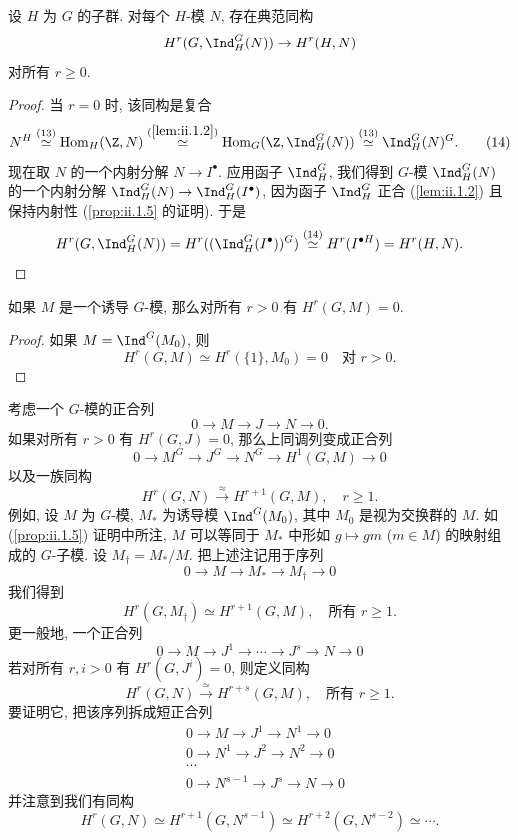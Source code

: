 \begin{proposition}[Shapiro 引理]\label{prop:ii.1.11}
设 $H$ 为 $G$ 的子群. 对每个 $H$-模 $N$, 存在典范同构
\[
 H^r(G,\Ind_H^G(N))\to H^r(H,N)
\]
对所有 $r\ge 0$.
\end{proposition}

\begin{proof}
当 $r=0$ 时, 该同构是复合
\begin{equation*}
 N^H\overset{(13)}{\simeq}\operatorname{Hom}_H(\Z,N)\overset{(\ref{lem:ii.1.2})}{\simeq}\operatorname{Hom}_G(\Z,\Ind_H^G(N))\overset{(13)}{\simeq}\Ind_H^G(N)^G.
\tag{14}
\end{equation*}
现在取 $N$ 的一个内射分解 $N\to I^\bullet$. 应用函子 $\Ind_H^G$, 我们得到 $G$-模 $\Ind_H^G(N)$ 的一个内射分解 $\Ind_H^G(N)\to \Ind_H^G(I^\bullet)$, 因为函子 $\Ind_H^G$ 正合 (\ref{lem:ii.1.2}) 且保持内射性 (\ref{prop:ii.1.5} 的证明). 于是
\[
 H^r(G,\Ind_H^G(N))=H^r((\Ind_H^G(I^\bullet))^G)\stackrel{(14)}{\simeq} H^r(I^{\bullet H})=H^r(H,N).
\]
\end{proof}

\begin{corollary}\label{cor:ii.1.12}
如果 $M$ 是一个诱导 $G$-模, 那么对所有 $r>0$ 有 $H^r(G,M)=0$.
\end{corollary}

\begin{proof}
如果 $M=\Ind^G(M_0)$, 则
\[
 H^r(G,M)\simeq H^r(\{1\},M_0)=0\quad\text{对 }r>0.
\]
\end{proof}

\begin{remark}\label{rem:ii.1.13}
考虑一个 $G$-模的正合列
\[
 0\to M\to J\to N\to 0.
\]
如果对所有 $r>0$ 有 $H^r(G,J)=0$, 那么上同调列变成正合列
\[
 0\to M^G\to J^G\to N^G\to H^1(G,M)\to 0
\]
以及一族同构
\[
 H^r(G,N)\xrightarrow{\approx} H^{r+1}(G,M),\quad r\ge 1.
\]
例如, 设 $M$ 为 $G$-模, $M_*$ 为诱导模 $\Ind^G(M_0)$, 其中 $M_0$ 是视为交换群的 $M$. 如 (\ref{prop:ii.1.5}) 证明中所注, $M$ 可以等同于 $M_*$ 中形如 $g\mapsto gm$ ($m\in M$) 的映射组成的 $G$-子模. 设 $M_\dagger=M_*/M$. 把上述注记用于序列
\begin{equation*}
 0\to M\to M_*\to M_\dagger\to 0
\tag{15}\label{eqn:ii.1.15}
\end{equation*}
我们得到
\[
 H^r(G,M_\dagger)\simeq H^{r+1}(G,M),\quad\text{所有 }r\ge 1.
\]
更一般地, 一个正合列
\[
 0\to M\to J^1\to\cdots\to J^s\to N\to 0
\]
若对所有 $r,i>0$ 有 $H^r(G,J^i)=0$, 则定义同构
\[
 H^r(G,N)\xrightarrow{\simeq} H^{r+s}(G,M),\quad\text{所有 }r\ge 1.
\]
要证明它, 把该序列拆成短正合列
\[
 \begin{aligned}
 &0\to M\to J^1\to N^1\to 0\\
 &0\to N^1\to J^2\to N^2\to 0\\
 &\cdots\\
 &0\to N^{s-1}\to J^s\to N\to 0
 \end{aligned}
\]
并注意到我们有同构
\[
 H^r(G,N)\simeq H^{r+1}(G,N^{s-1})\simeq H^{r+2}(G,N^{s-2})\simeq\cdots.
\]
\end{remark}

